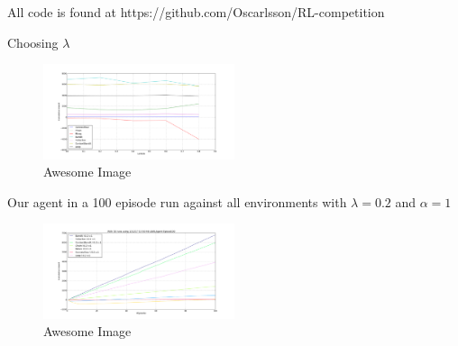 All code is found at https://github.com/Oscarlsson/RL-competition

Choosing $\lambda$
\begin{figure}[h]
    \centering
    \includegraphics[width=0.5\textwidth]{../data/lambdasweepplot.png}
    \caption{Awesome Image}
    \label{fig:awesome_image}
\end{figure}


Our agent in a 100 episode run against all environments with $\lambda = 0.2$ and $\alpha = 1$
\begin{figure}[h]
    \centering
    \includegraphics[width=0.5\textwidth]{../data/100episodes_50runs.png}
    \caption{Awesome Image}
    \label{fig:awesome_image}
\end{figure}

